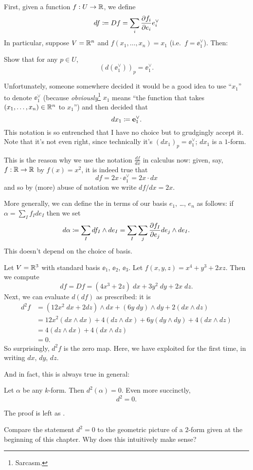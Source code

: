 First, given a function $f : U \to \mathbb R$,
we define
\[ df \coloneqq Df = \sum_i \frac{\partial f_i}{\partial e_i} e_i^\vee \]
In particular, suppose $V = \mathbb R^n$ and $f(x_1, \dots, x_n) = x_1$
(i.e.\ $f = \ee_1^\vee$). Then:
\begin{ques}
	Show that for any $p \in U$, \[ \left( d(\ee_1^\vee) \right)_p = \ee_1^\vee. \]
\end{ques}

\begin{abuse}
	Unfortunately, someone somewhere decided
	it would be a good idea to use ``$x_1$'' to denote $\ee_1^\vee$
	(because \emph{obviously}\footnote{Sarcasm.} $x_1$ means
	``the function that takes $(x_1, \dots, x_n) \in \mathbb R^n$ to $x_1$'')
	and then decided that \[ dx_1 \coloneqq \mathbf e_1^\vee. \]
	This notation is so entrenched that I have no choice
	but to grudgingly accept it.
	Note that it's not even right,
	since technically it's $(dx_1)_p = \ee_1^\vee$; $dx_1$ is a $1$-form.
	\label{abuse:dx}
\end{abuse}
\begin{remark}
	This is the reason why we use the notation $\frac{df}{dx}$ in calculus now:
	given, say, $f : \mathbb R \to \mathbb R$ by $f(x) = x^2$, it is indeed true that
	\[ df = 2x \cdot \ee_1^\vee = 2x \cdot dx \]
	and so by (more) abuse of notation we write $df/dx = 2x$.
\end{remark}

More generally, we can define the 
in terms of our basis $e_1$, \dots, $e_n$ as follows:
if $\alpha = \sum_I f_I de_I$ then we set
\[ d\alpha \coloneqq \sum_I df_I \wedge de_I
	= \sum_I \sum_j \frac{\partial f_I}{\partial e_j} de_j \wedge de_I. \]
This doesn't depend on the choice of basis.

\begin{example}
	Let $V = \mathbb R^3$ with standard basis $\ee_1$, $\ee_2$, $\ee_3$.
	Let $f(x,y,z) = x^4 + y^3 + 2xz$.
	Then we compute
	\[ df = Df = (4x^3+2z) \; dx + 3y^2 \; dy + 2x \; dz. \]
	Next, we can evaluate $d(df)$ as prescribed: it is
	\begin{align*}
		d^2f &= (12x^2 \; dx + 2 dz) \wedge dx + (6y \; dy) \wedge dy
		+ 2(dx \wedge dz) \\
		&= 12x^2 (dx \wedge dx) + 4(dz \wedge dx) + 6y (dy \wedge dy) + 4(dx \wedge dz) \\
		&= 4(dz \wedge dx) + 4(dx \wedge dz) \\
		&= 0.
	\end{align*}
	So surprisingly, $d^2f$ is the zero map.
	Here, we have exploited  for the first time,
	in writing $dx$, $dy$, $dz$.
\end{example}
And in fact, this is always true in general:
\begin{theorem}
	\label{thm:dd_zero}
	Let $\alpha$ be any $k$-form.
	Then $d^2(\alpha) = 0$.
	Even more succinctly, \[ d^2 = 0. \]
\end{theorem}
The proof is left as .
\begin{exercise}
	Compare the statement $d^2 = 0$ to the geometric
	picture of a $2$-form given at the beginning of this chapter.
	Why does this intuitively make sense?
\end{exercise}

